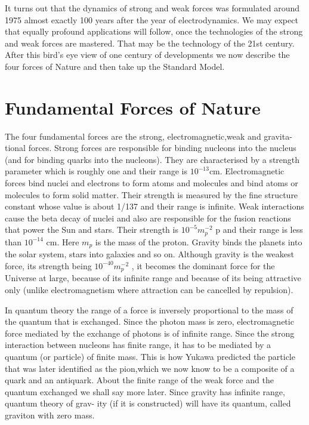 It turns out that the dynamics of strong and weak forces was formulated around
1975 almost exactly 100 years after the year of electrodynamics. We may expect
that equally profound applications will follow, once the technologies of the strong
and weak forces are mastered. That may be the technology of the 21st century.
After this bird’s eye view of one century of developments we now describe the
four forces of Nature and then take up the Standard Model.

\section*{Fundamental Forces of Nature}

The four fundamental forces are the strong, electromagnetic,weak and gravita-
tional forces. Strong forces are responsible for binding nucleons into the nucleus
(and for binding quarks into the nucleons). They are characterised by a strength
parameter which is roughly one and their range is $10^{-13}$cm. Electromagnetic
forces bind nuclei and electrons to form atoms and molecules and bind atoms or
molecules to form solid matter. Their strength is measured by the fine structure
constant whose value is about 1/137 and their range is infinite. Weak interactions
cause the beta decay of nuclei and also are responsible for the fusion reactions that
power the Sun and stars. Their strength is $10^{-5} m_{p}^{-2}$
p and their range is less than
 $10^{-14}$ cm. Here  $m_{p}$ is the mass of the proton. Gravity binds the planets into the
solar system, stars into galaxies and so on. Although gravity is the weakest force,
its strength being $10^{-40} m_{p}^{-2}$
, it becomes the dominant force for the Universe at
large, because of its infinite range and because of its being attractive only (unlike
electromagnetism where attraction can be cancelled by repulsion).

In quantum theory the range of a force is inversely proportional to the mass
of the quantum that is exchanged. Since the photon mass is zero, electromagnetic
force mediated by the exchange of photons is of infinite range. Since the strong
interaction between nucleons has finite range, it has to be mediated by a quantum
(or particle) of finite mass. This is how Yukawa predicted the particle that was
later identified as the pion,which we now know to be a composite of a quark and
an antiquark. About the finite range of the weak force and the quantum exchanged
we shall say more later. Since gravity has infinite range, quantum theory of grav-
ity (if it is constructed) will have its quantum, called graviton with zero mass.


